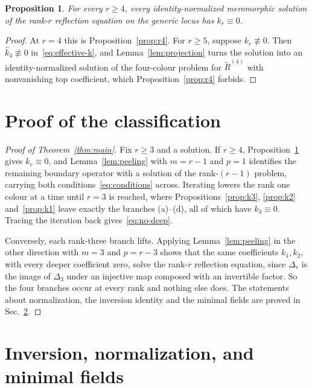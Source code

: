 \documentclass[
  aps,pre,
  reprint,
  superscriptaddress,
  amsmath,amssymb,
  floatfix
]{revtex4-2}
\theoremstyle{plain}
\newtheorem{proposition}[theorem]{Proposition}
\theoremstyle{definition}
\theoremstyle{remark}
\begin{document}
\begin{proposition}
\label{prop:no-top}
For every $r\ge4$, every identity-normalized meromorphic solution of the
rank-$r$ reflection equation on the generic locus has $k_r\equiv0$.
\end{proposition}

\begin{proof}
At $r=4$ this is Proposition~\ref{prop:r4}. For $r\ge5$, suppose
$k_r\not\equiv0$. Then $\widehat k_4\not\equiv0$
in~\eqref{eq:effective-k}, and Lemma~\ref{lem:projection} turns the solution
into an identity-normalized solution of the four-colour problem for
$\widetilde R^{(4)}$ with nonvanishing top coefficient, which
Proposition~\ref{prop:r4} forbids.
\end{proof}

\section{Proof of the classification}
\label{sec:induction}

\begin{proof}[Proof of Theorem~\ref{thm:main}]
Fix $r\ge3$ and a solution. If $r\ge4$, Proposition~\ref{prop:no-top} gives
$k_r\equiv0$, and Lemma~\ref{lem:peeling} with $m=r-1$ and $p=1$ identifies the
remaining boundary operator with a solution of the rank-$(r-1)$ problem,
carrying both conditions~\eqref{eq:conditions} across. Iterating lowers the
rank one colour at a time until $r=3$ is reached, where
Propositions~\ref{prop:k3}, \ref{prop:k2} and~\ref{prop:k1} leave exactly the
branches \textup{(a)}--\textup{(d)}, all of which have $k_3\equiv0$. Tracing
the iteration back gives~\eqref{eq:no-deep}.

Conversely, each rank-three branch lifts. Applying
Lemma~\ref{lem:peeling} in the other direction with $m=3$ and $p=r-3$ shows
that the same coefficients $k_1,k_2$, with every deeper coefficient zero, solve
the rank-$r$ reflection equation, since $\Delta_r$ is the image of $\Delta_3$
under an injective map composed with an invertible factor. So the four branches
occur at every rank and nothing else does. The statements about normalization,
the inversion identity and the minimal fields are proved in
Sec.~\ref{sec:unitarity}.
\end{proof}

\section{Inversion, normalization, and minimal fields}
\label{sec:unitarity}
\end{document}
